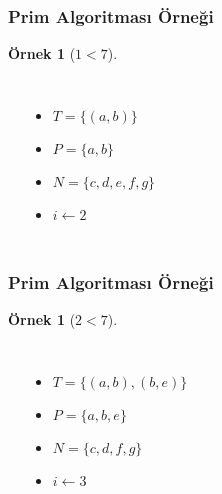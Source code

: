 \documentclass[dvipsnames]{beamer}
\theoremstyle{definition}
\theoremstyle{example}
\newtheorem{ornek}[theorem]{Örnek}
\theoremstyle{plain}
\begin{document}
\begin{frame}
  \frametitle{Prim Algoritması Örneği}

  \begin{ornek}[$1 < 7$]
    \begin{columns}
      \begin{center}
      \end{center}

      \pause
      \begin{itemize}
        \item $T = \{ (a,b) \}$
        \item $P = \{ a, b \}$
        \item $N = \{ c, d, e, f, g \}$
        \item $i \leftarrow 2$
      \end{itemize}
    \end{columns}
  \end{ornek}
\end{frame}

\begin{frame}
  \frametitle{Prim Algoritması Örneği}

  \begin{ornek}[$2 < 7$]
    \begin{columns}
      \begin{center}
      \end{center}

      \pause
      \begin{itemize}
        \item $T = \{ (a,b), (b,e) \}$
        \item $P = \{ a, b, e \}$
        \item $N = \{ c, d, f, g \}$
        \item $i \leftarrow 3$
      \end{itemize}
    \end{columns}
  \end{ornek}
\end{frame}
\end{document}
